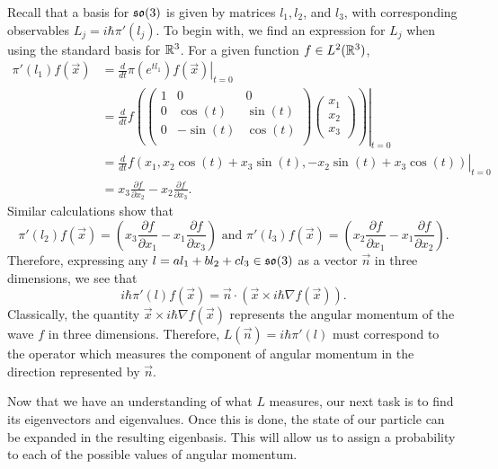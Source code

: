 \documentclass[a4paper]{article}
\begin{document}
Recall that a basis for $\mathfrak{so}(3)$ is given by matrices $l_1, l_2$, and $l_3$, with corresponding observables $L_j = i\hbar\pi'(l_j)$.  To begin with, we find an expression for $L_j$ when using the standard basis for $\mathbb{R}^3$. For a given function $f \in L^2(\mathbb{R}^3)$,
\begin{align*}
    \pi'(l_1)f(\vec{x}) &= \left. \frac{d}{dt} \pi\left(e^{t l_1}\right)f(\vec{x}) \right|_{t=0}\\ 
    &= \left. \frac{d}{dt} f\left(\begin{pmatrix} 1 & 0 & 0 \\ 0 & \cos(t) & \sin(t) \\ 0 & -\sin(t) & \cos(t) \\ \end{pmatrix} \begin{pmatrix}x_1 \\ x_2 \\ x_3 \end{pmatrix}\right) \right|_{t=0}\\
    &= \left. \frac{d}{dt} f(x_1, x_2\cos(t) + x_3 \sin(t), -x_2\sin(t) + x_3 \cos(t)) \right|_{t=0}\\ 
    &= x_3\frac{\partial f}{\partial x_2} - x_2\frac{\partial f}{\partial x_3}.
\end{align*}
Similar calculations show that 
$$\pi'(l_2)f(\vec{x}) = \left(x_3\frac{\partial f}{\partial x_1} - x_1\frac{\partial f}{\partial x_3}\right) \text{  and  } \pi'(l_3)f(\vec{x}) = \left(x_2\frac{\partial f}{\partial x_1} - x_1\frac{\partial f}{\partial x_2}\right).$$
Therefore, expressing any $l = al_1 + bl_2 + cl_3 \in \mathfrak{so}(3)$ as a vector $\vec{n}$ in three dimensions, we see that 
$$i\hbar\pi'(l)f(\vec{x}) = \vec{n} \cdot (\vec{x} \times i\hbar \nabla f(\vec{x})).$$
Classically, the quantity $
\vec{x} \times i\hbar \nabla f(\vec{x})$ represents the angular momentum of the wave $f$ in three dimensions. Therefore, $L(\vec{n}) = i\hbar\pi'(l)$ must correspond to the operator which measures the component of angular momentum in the direction represented by $\vec{n}$.

Now that we have an understanding of what $L$ measures, our next task is to find its eigenvectors and eigenvalues. Once this is done, the state of our particle can be expanded in the resulting eigenbasis. This will allow us to assign a probability to each of the possible values of angular momentum. 
\end{document}
